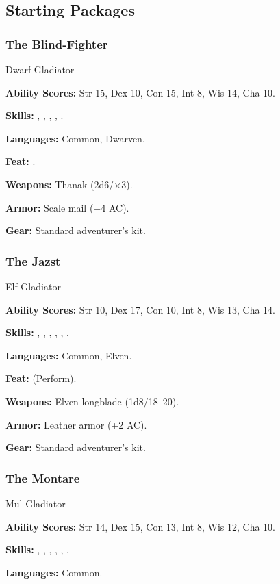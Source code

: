 \subsection{Starting Packages}
\subsubsection{The Blind-Fighter}
Dwarf Gladiator

\textbf{Ability Scores:} Str 15, Dex 10, Con 15, Int 8, Wis 14, Cha 10.

\textbf{Skills:} , , , , .

\textbf{Languages:} Common, Dwarven.

\textbf{Feat:} .

\textbf{Weapons:} Thanak (2d6/$\times$3).

\textbf{Armor:} Scale mail (+4 AC).

\textbf{Gear:} Standard adventurer's kit.

\subsubsection{The Jazst}
Elf Gladiator

\textbf{Ability Scores:} Str 10, Dex 17, Con 10, Int 8, Wis 13, Cha 14.

\textbf{Skills:} , , , , , .

\textbf{Languages:} Common, Elven.

\textbf{Feat:}  (Perform).

\textbf{Weapons:} Elven longblade (1d8/18--20).

\textbf{Armor:} Leather armor (+2 AC).

\textbf{Gear:} Standard adventurer's kit.

\subsubsection{The Montare}
Mul Gladiator

\textbf{Ability Scores:} Str 14, Dex 15, Con 13, Int 8, Wis 12, Cha 10.

\textbf{Skills:} , , , , , .

\textbf{Languages:} Common.

